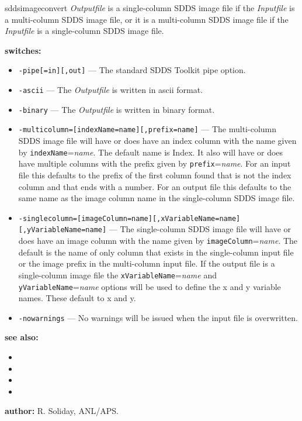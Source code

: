 \begin{sddsprog}{sddsimageconvert}
  \emph{Outputfile} is a single-column SDDS image file if the \emph{Inputfile} is a multi-column SDDS image file, or it is a multi-column SDDS image file if the \emph{Inputfile} is a single-column SDDS image file.
  \item \textbf{switches:}
    \begin{itemize}
      \item {\tt -pipe[=in][,out]} --- The standard SDDS Toolkit pipe option.
      \item {\tt -ascii} --- The \emph{Outputfile} is written in ascii format.
      \item {\tt -binary} --- The \emph{Outputfile} is written in binary format.
      \item {\tt -multicolumn=[indexName=name][,prefix=name]} --- The multi-column SDDS image file will have or does have an index column with the name given by \verb|indexName|=\emph{name}. The default name is Index. It also will have or does have multiple columns with the prefix given by \verb|prefix|=\emph{name}. For an input file this defaults to the prefix of the first column found that is not the index column and that ends with a number. For an output file this defaults to the same name as the image column name in the single-column SDDS image file.
      \item {\tt -singlecolumn=[imageColumn=name][,xVariableName=name][,yVariableName=name]} --- The single-column SDDS image file will have or does have an image column with the name given by \verb|imageColumn|=\emph{name}. The default is the name of only column that exists in the single-column input file or the image prefix in the multi-column input file. If the output file is a single-column image file the \verb|xVariableName|=\emph{name} and \verb|yVariableName|=\emph{name} options will be used to define the x and y variable names. These default to x and y.
      \item {\tt -nowarnings} --- No warnings will be issued when the input file is overwritten.
    \end{itemize}
  \item \textbf{see also:}
    \begin{itemize}
      \item {}
      \item {}
      \item {}
      \item {}
    \end{itemize}
  \item \textbf{author:} R. Soliday, ANL/APS.
\end{sddsprog}

